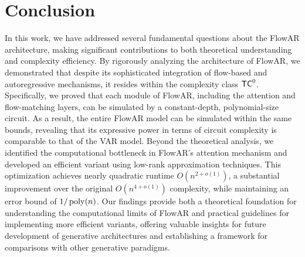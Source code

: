 \section{Conclusion}\label{sec:conclusion}
In this work, we have addressed several fundamental questions about the FlowAR architecture, making significant contributions to both theoretical understanding and complexity efficiency. By rigorously analyzing the architecture of FlowAR, we demonstrated that despite its sophisticated integration of flow-based and autoregressive mechanisms, it resides within the complexity class $\mathsf{TC}^0$. Specifically, we proved that each module of FlowAR, including the attention and flow-matching layers, can be simulated by a constant-depth, polynomial-size circuit. As a result, the entire FlowAR model can be simulated within the same bounds, revealing that its expressive power in terms of circuit complexity is comparable to that of the VAR model. Beyond the theoretical analysis, we identified the computational bottleneck in FlowAR's attention mechanism and developed an efficient variant using low-rank approximation techniques. This optimization achieves nearly quadratic runtime $O(n^{2+o(1)})$, a substantial improvement over the original $O(n^{4+o(1)})$ complexity, while maintaining an error bound of $1/\operatorname{poly}(n)$. Our findings provide both a theoretical foundation for understanding the computational limits of FlowAR and practical guidelines for implementing more efficient variants, offering valuable insights for future development of generative architectures and establishing a framework for comparisons with other generative paradigms.